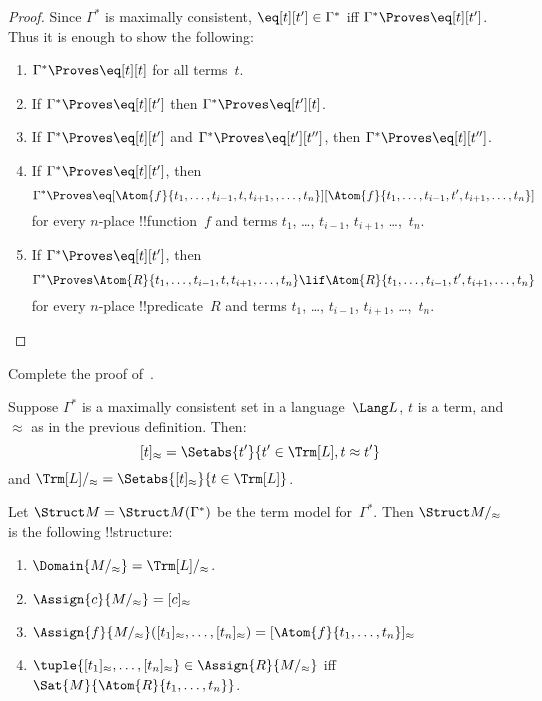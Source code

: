 \documentclass[../../include/open-logic-section]{subfiles}
\begin{document}
\begin{proof}
Since $\Gamma^*$ is maximally consistent, $\eq[t][t'] \in \Gamma^*$
iff $\Gamma^* \Proves \eq[t][t']$. Thus it is enough to show the
following:
\begin{enumerate}
\item $\Gamma^* \Proves \eq[t][t]$ for all terms~$t$.
\item If $\Gamma^* \Proves \eq[t][t']$ then $\Gamma^* \Proves \eq[t'][t]$.
\item If $\Gamma^* \Proves \eq[t][t']$ and $\Gamma^* \Proves
  \eq[t'][t'']$, then $\Gamma^* \Proves \eq[t][t'']$.
\item If $\Gamma^* \Proves \eq[t][t']$, then 
\[
\Gamma^* \Proves
\eq[\Atom{f}{t_1,\dots,t_{i-1},t,t_{i+1},,\dots,t_n}][\Atom{f}{t_1,\dots,t_{i-1},t',t_{i+1},\dots,t_n}]
\]
for every $n$-place !!{function}~$f$ and terms $t_1$, \dots,
$t_{i-1}$, $t_{i+1}$, \dots,~$t_n$.
\item If $\Gamma^* \Proves \eq[t][t']$, then
\[
\Gamma^* \Proves
\Atom{R}{t_1,\dots,t_{i-1},t,t_{i+1},\dots,t_n}
\lif \Atom{R}{t_1,\dots,t_{i-1},t',t_{i+1},\dots,t_n}
\]
for every $n$-place !!{predicate}~$R$ and terms $t_1$, \dots,
$t_{i-1}$, $t_{i+1}$, \dots,~$t_n$.
\end{enumerate}
\end{proof}

\begin{prob}
Complete the proof of~.
\end{prob}

\begin{defn}
Suppose $\Gamma^*$ is a maximally consistent set in a language~$\Lang
L$, $t$ is a term, and $\approx$ as in the previous definition. Then:
\[
[t]_\approx = \Setabs{t'}{t'\in \Trm[L], t \approx t'}
\]
and $\Trm[L]/_\approx = \Setabs{[t]_\approx}{t \in \Trm[L]}$.
\end{defn}

\begin{defn}
Let $\Struct M = \Struct M(\Gamma^*)$ be the term model for~$\Gamma^*$. Then
$\Struct M/_\approx$ is the following !!{structure}:
\begin{enumerate}
\item $\Domain{M/_\approx} = \Trm[L]/_\approx$.
\item $\Assign{c}{M/_\approx} = [c]_\approx$
\item $\Assign{f}{M/_\approx}([t_1]_\approx, \dots,
  [t_n]_\approx) = [\Atom{f}{t_1,\dots, t_n}]_\approx$
\item $\tuple{[t_1]_\approx, \dots, [t_n]_\approx} \in
  \Assign{R}{M/_\approx}$ iff $\Sat{M}{\Atom{R}{t_1,\dots, t_n}}$.
\end{enumerate}
\end{defn}
\end{document}
